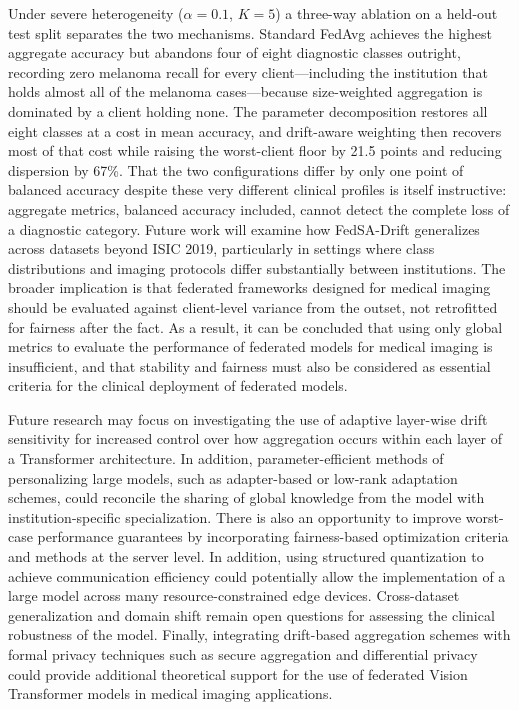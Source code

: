 \documentclass{ieeeaccess}
\newcommand{\sadrift}{FedSA-Drift}
\begin{document}
Under severe heterogeneity ($\alpha = 0.1$, $K = 5$) a three-way ablation on a held-out test split separates the two mechanisms. Standard FedAvg achieves the highest aggregate accuracy but abandons four of eight diagnostic classes outright, recording zero melanoma recall for every client---including the institution that holds almost all of the melanoma cases---because size-weighted aggregation is dominated by a client holding none. The parameter decomposition restores all eight classes at a cost in mean accuracy, and drift-aware weighting then recovers most of that cost while raising the worst-client floor by 21.5 points and reducing dispersion by 67\%. That the two configurations differ by only one point of balanced accuracy despite these very different clinical profiles is itself instructive: aggregate metrics, balanced accuracy included, cannot detect the complete loss of a diagnostic category. Future work will examine how \sadrift{} generalizes across datasets beyond ISIC 2019, particularly in settings where class distributions and imaging protocols differ substantially between institutions. The broader implication is that federated frameworks designed for medical imaging should be evaluated against client-level variance from the outset, not retrofitted for fairness after the fact. As a result, it can be concluded that using only global metrics to evaluate the performance of federated models for medical imaging is insufficient, and that stability and fairness must also be considered as essential criteria for the clinical deployment of federated models.

Future research may focus on investigating the use of adaptive layer-wise drift sensitivity for increased control over how aggregation occurs within each layer of a Transformer architecture. In addition, parameter-efficient methods of personalizing large models, such as adapter-based or low-rank adaptation schemes, could reconcile the sharing of global knowledge from the model with institution-specific specialization. There is also an opportunity to improve worst-case performance guarantees by incorporating fairness-based optimization criteria and methods at the server level. In addition, using structured quantization to achieve communication efficiency could potentially allow the implementation of a large model across many resource-constrained edge devices. Cross-dataset generalization and domain shift remain open questions for assessing the clinical robustness of the model. Finally, integrating drift-based aggregation schemes with formal privacy techniques such as secure aggregation and differential privacy could provide additional theoretical support for the use of federated Vision Transformer models in medical imaging applications.
\end{document}
